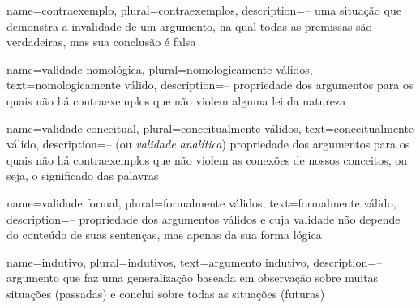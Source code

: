   {
  name=contraexemplo,
  plural=contraexemplos,
  description={-- uma situação que demonstra a invalidade de um argumento, na qual todas as premissas são verdadeiras, mas sua conclusão é falsa}
  }
  
  {
  name=validade nomológica,
  plural=nomologicamente válidos,
  text=nomologicamente válido,
  description={-- propriedade dos argumentos para os quais não há contraexemplos que não violem alguma lei da natureza}
  }
  
  {
  name=validade conceitual,
  plural=conceitualmente válidos,
  text=conceitualmente válido,
  description={-- (ou \textit{validade analítica}) propriedade dos argumentos para os quais não há contraexemplos que não violem as conexões de nossos conceitos, ou seja, o significado das palavras}
  }
  
  {
  name=validade formal,
  plural=formalmente válidos,
  text=formalmente válido,
  description={-- propriedade dos argumentos válidos e cuja validade não depende do conteúdo de suas sentenças, mas apenas da sua forma lógica}
  }
  
  {
  name=indutivo,
  plural=indutivos,
  text=argumento indutivo,
  description={-- argumento que faz uma generalização baseada em observação sobre muitas situações (passadas) e conclui sobre todas as situações (futuras)}
  }
  